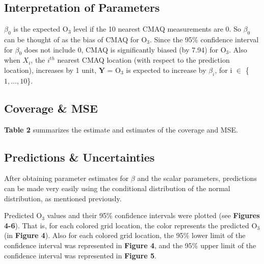 \documentclass{article}                                                   %
\def\wl{\par \vspace{\baselineskip}}                                      %
\begin{document}
    

  \subsection{Interpretation of Parameters} 
    $\beta_0$ is the expected O$_3$ level if the 10 nearest CMAQ measurements
    are 0. So $\beta_0$ can be thought of as the bias of CMAQ for O$_3$. Since
    the 95\% confidence interval for $\beta_0$ does not include 0, CMAQ is
    significantly biased (by 7.94) for O$_3$.  Also when $X_i$, the $i^{th}$
    nearest CMAQ location (with respect to the prediction location), increases
    by 1 unit, $\bm Y$ = O$_3$ is expected to increase by $\beta_i$, for i
    $\in$ \{$1,\dots,10$\}.

  \subsection{Coverage \& MSE }
    \textbf{Table 2} summarizes the estimate and estimates of the coverage and MSE.
    

  \subsection{Predictions \& Uncertainties}
    After obtaining parameter estimates for $\beta$ and the scalar parameters,
    predictions can be made very easily using the conditional distribution
    of the normal distribution, as mentioned previously.
    \wl\noindent
    Predicted O$_3$ values and their 95\% confidence intervals were plotted
    (see \textbf{Figures 4-6}). That is, for each colored grid location, the color
    represents the predicted O$_3$ (in \textbf{Figure 4}). Also for each colored
    grid location, the 95\% lower limit of the confidence interval was represented
    in \textbf{Figure 4}, and the 95\% upper limit of the confidence interval
    was represented in \textbf{Figure 5}.
\end{document}
